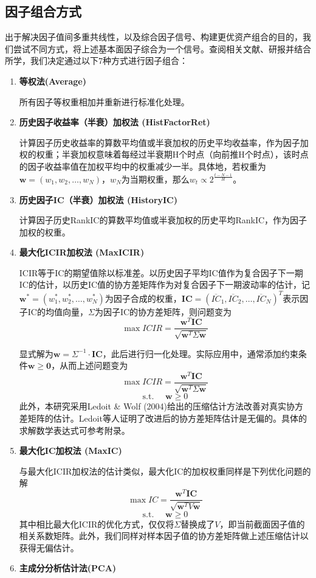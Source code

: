 \documentclass[11pt]{article}
\begin{document}
\subsection{因子组合方式}
出于解决因子值间多重共线性，以及综合因子信号、构建更优资产组合的目的，我们尝试不同方式，将上述基本面因子综合为一个信号。查阅相关文献、研报并结合所学，我们决定通过以下7种方式进行因子组合：
\begin{enumerate}
    \item \textbf{等权法(Average)}
    
    所有因子等权重相加并重新进行标准化处理。
    \item \textbf{历史因子收益率（半衰）加权法 (HistFactorRet)}
    
    计算因子历史收益率的算数平均值或半衰加权的历史平均收益率，作为因子加权的权重；半衰加权意味着每经过半衰期H个时点（向前推H个时点），该时点的因子收益率值在加权平均中的权重减少一半。具体地，若权重为$\bm{w} = (w_1,w_2,\dots,w_N)$，$w_N$为当期权重，那么$w_t \propto 2^{\frac{t-N-1}{H}}$。
    \item \textbf{历史因子IC（半衰）加权法 (HistoryIC)}
    
    计算因子历史RankIC的算数平均值或半衰加权的历史平均RankIC，作为因子加权的权重。
    \item \textbf{最大化ICIR加权法 (MaxICIR)}
    
    ICIR等于IC的期望值除以标准差。以历史因子平均IC值作为复合因子下一期IC的估计，以历史IC值的协方差矩阵作为对复合因子下一期波动率的估计，记$\bm{w}^*=(w_1^*,w_2^*,\dots,w_N^*)$为因子合成的权重，$\bm{IC}=(\overline{IC}_1, \overline{IC}_2, \dots,\overline{IC}_N)^T$表示因子IC的均值向量，$\Sigma$为因子IC的协方差矩阵，则问题变为
$$\max ICIR=\frac{\bm{w}^T \bm{IC}}{\sqrt{\bm{w}^T \Sigma \bm{w}}}$$ 

显式解为$\bm{w}=\Sigma^{-1} \cdot \bm{IC}$，此后进行归一化处理。实际应用中，通常添加约束条件$\bm{w} \geq \bm{0}$，从而上述问题变为
$$\max ICIR=\frac{\bm{w}^T \bm{IC}}{\sqrt{\bm{w}^T \Sigma \bm{w}}}$$ $$\text{s.t. }\quad \bm{w}\geq 0$$ 
此外，本研究采用Ledoit \& Wolf (2004)\cite{ledoit2004well}给出的压缩估计方法改善对真实协方差矩阵的估计。Ledoit等人证明了改进后的协方差矩阵估计是无偏的。具体的求解数学表达式可参考附录。
\item \textbf{最大化IC加权法 (MaxIC)}

与最大化ICIR加权法的估计类似，最大化IC的加权权重同样是下列优化问题的解
$$\max IC=\frac{\bm{w}^T \bm{IC}}{\sqrt{\bm{w}^T V \bm{w}}}$$ $$\text{s.t. }\quad \bm{w}\geq 0$$ 其中相比最大化ICIR的优化方式，仅仅将$\Sigma$替换成了$V$，即当前截面因子值的相关系数矩阵。此外，我们同样对样本因子值的协方差矩阵做上述压缩估计以获得无偏估计。
\item \textbf{主成分分析估计法(PCA)}


\end{enumerate}
\end{document}

